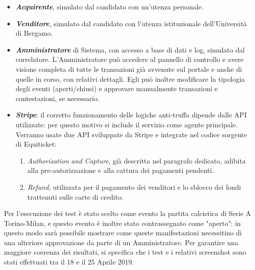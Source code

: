 \begin{itemize}
\item \textbf{\textit{Acquirente}}, simulato dal candidato con un'utenza personale.
\item \textbf{\textit{Venditore}}, simulato dal candidato con l'utenza istituzionale dell'Università di Bergamo.
\item \textit{\textbf{Amministratore}} di Sistema, con accesso a base di dati e log, simulato dal correlatore. L'Amministratore può accedere al pannello di controllo e avere visione completa di tutte le transazioni già avvenute sul portale e anche di quelle in corso, con relativi dettagli. Egli può inoltre modificare la tipologia degli eventi (aperti/chiusi) e approvare manualmente transazioni e contestazioni, se necessario. 
\item \textbf{\textit{Stripe}}: il corretto funzionamento delle logiche anti-truffa dipende dalle API utilizzate: per questo motivo si include il servizio come agente principale. Verranno usate due API sviluppate da Stripe e integrate nel codice sorgente di Equiticket: 
\begin{enumerate}
\item \emph{Authorization and Capture}, già descritta nel paragrafo dedicato, adibita alla pre-autorizzazione e alla cattura dei pagamenti pendenti. 
\item \emph{Refund}, utilizzata per il pagamento dei venditori e lo sblocco dei fondi trattenuti sulle carte di credito. 
\end{enumerate}
\end{itemize}
Per l'esecuzione dei test è stato scelto come evento la partita calcistica di Serie A Torino-Milan, e questo evento è inoltre stato contrassegnato come "aperto": in questo modo sarà possibile mostrare come queste manifestazioni necessitino di una ulteriore approvazione da parte di un Amministratore. 
Per garantire una maggiore coerenza dei risultati, si specifica che i test e i relativi screenshot sono stati effettuati tra il 18 e il 25 Aprile 2019. 

